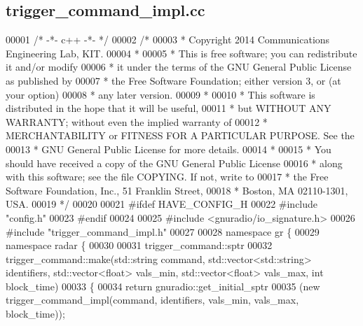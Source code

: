 \subsection{trigger\+\_\+command\+\_\+impl.\+cc}
\label{trigger__command__impl_8cc_source}

\begin{DoxyCode}
00001 \textcolor{comment}{/* -*- c++ -*- */}
00002 \textcolor{comment}{/* }
00003 \textcolor{comment}{ * Copyright 2014 Communications Engineering Lab, KIT.}
00004 \textcolor{comment}{ * }
00005 \textcolor{comment}{ * This is free software; you can redistribute it and/or modify}
00006 \textcolor{comment}{ * it under the terms of the GNU General Public License as published by}
00007 \textcolor{comment}{ * the Free Software Foundation; either version 3, or (at your option)}
00008 \textcolor{comment}{ * any later version.}
00009 \textcolor{comment}{ * }
00010 \textcolor{comment}{ * This software is distributed in the hope that it will be useful,}
00011 \textcolor{comment}{ * but WITHOUT ANY WARRANTY; without even the implied warranty of}
00012 \textcolor{comment}{ * MERCHANTABILITY or FITNESS FOR A PARTICULAR PURPOSE.  See the}
00013 \textcolor{comment}{ * GNU General Public License for more details.}
00014 \textcolor{comment}{ * }
00015 \textcolor{comment}{ * You should have received a copy of the GNU General Public License}
00016 \textcolor{comment}{ * along with this software; see the file COPYING.  If not, write to}
00017 \textcolor{comment}{ * the Free Software Foundation, Inc., 51 Franklin Street,}
00018 \textcolor{comment}{ * Boston, MA 02110-1301, USA.}
00019 \textcolor{comment}{ */}
00020 
00021 \textcolor{preprocessor}{#ifdef HAVE\_CONFIG\_H}
00022 \textcolor{preprocessor}{#include "config.h"}
00023 \textcolor{preprocessor}{#endif}
00024 
00025 \textcolor{preprocessor}{#include <gnuradio/io\_signature.h>}
00026 \textcolor{preprocessor}{#include "trigger_command_impl.h"}
00027 
00028 \textcolor{keyword}{namespace }gr \{
00029   \textcolor{keyword}{namespace }radar \{
00030 
00031     trigger_command::sptr
00032     trigger_command::make(std::string command, std::vector<std::string> identifiers, std::vector<float> 
      vals\_min, std::vector<float> vals\_max, \textcolor{keywordtype}{int} block\_time)
00033     \{
00034       \textcolor{keywordflow}{return} gnuradio::get\_initial\_sptr
00035         (\textcolor{keyword}{new} trigger_command_impl(command, identifiers, vals\_min, vals\_max, block\_time));

\end{DoxyCode}
